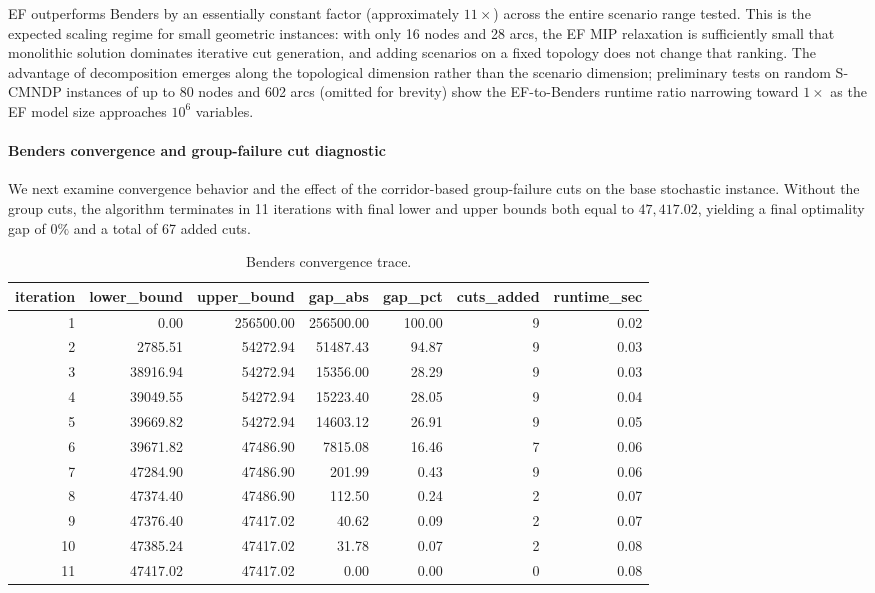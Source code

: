 \documentclass[final,3p,authoryear]{elsarticle}
\theoremstyle{definition}
\begin{document}
EF outperforms Benders by an essentially constant factor (approximately
$11\times$) across the entire scenario range tested. This is the expected
scaling regime for small geometric instances: with only 16 nodes and 28
arcs, the EF MIP relaxation is sufficiently small that monolithic
solution dominates iterative cut generation, and adding scenarios on a
fixed topology does not change that ranking. The advantage of
decomposition emerges along the topological dimension rather than the
scenario dimension; preliminary tests on random S-CMNDP instances of up
to 80 nodes and 602 arcs (omitted for brevity) show the EF-to-Benders
runtime ratio narrowing toward $1\times$ as the EF model size approaches
$10^6$ variables.

\paragraph{Benders convergence and group-failure cut diagnostic}
We next examine convergence behavior and the effect of the corridor-based
group-failure cuts on the base stochastic instance. Without the group
cuts, the algorithm terminates in 11 iterations with final lower and
upper bounds both equal to \(47{,}417.02\), yielding a final optimality
gap of \(0\%\) and a total of 67 added cuts.

\begin{table}
\caption{Benders convergence trace.}
\label{tab:tab10_benders_convergence}
\begin{tabular}{rrrrrrr}
\toprule
iteration & lower\_bound & upper\_bound & gap\_abs & gap\_pct & cuts\_added & runtime\_sec \\
\midrule
1 & 0.00 & 256500.00 & 256500.00 & 100.00 & 9 & 0.02 \\
2 & 2785.51 & 54272.94 & 51487.43 & 94.87 & 9 & 0.03 \\
3 & 38916.94 & 54272.94 & 15356.00 & 28.29 & 9 & 0.03 \\
4 & 39049.55 & 54272.94 & 15223.40 & 28.05 & 9 & 0.04 \\
5 & 39669.82 & 54272.94 & 14603.12 & 26.91 & 9 & 0.05 \\
6 & 39671.82 & 47486.90 & 7815.08 & 16.46 & 7 & 0.06 \\
7 & 47284.90 & 47486.90 & 201.99 & 0.43 & 9 & 0.06 \\
8 & 47374.40 & 47486.90 & 112.50 & 0.24 & 2 & 0.07 \\
9 & 47376.40 & 47417.02 & 40.62 & 0.09 & 2 & 0.07 \\
10 & 47385.24 & 47417.02 & 31.78 & 0.07 & 2 & 0.08 \\
11 & 47417.02 & 47417.02 & 0.00 & 0.00 & 0 & 0.08 \\
\bottomrule
\end{tabular}
\end{table}
\end{document}
